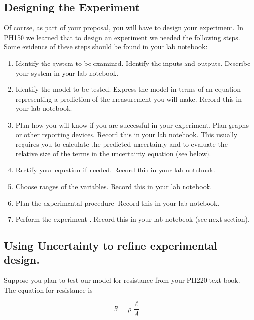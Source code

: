 \subsection{Designing the Experiment}

Of course, as part of your proposal, you will have to design your experiment. In PH150 we learned that to design an experiment we needed the following steps. Some evidence of these steps should be found in your lab notebook:

\begin{enumerate}
	\item Identify the system to be examined. Identify the inputs and outputs.
	Describe your system in your lab notebook.
	
	\item Identify the model to be tested. Express the model in terms of an
	equation representing a prediction of the measurement you will make. Record
	this in your lab notebook.
	
	\item Plan how you will know if you are successful in your experiment. Plan
	graphs or other reporting devices. Record this in your lab notebook. This
	usually requires you to calculate the predicted uncertainty and to evaluate
	the relative size of the terms in the uncertainty equation (see below).
	
	\item Rectify your equation if needed. Record this in your lab notebook.
	
	\item Choose ranges of the variables. Record this in your lab notebook.
	
	\item Plan the experimental procedure. Record this in your lab notebook.
	
	\item Perform the experiment . Record this in your lab notebook (see next
	section).
\end{enumerate}

\subsection{Using Uncertainty to refine experimental design.}

Suppose you plan to test our model for resistance from your PH220 text book.
The equation for resistance is 

\begin{equation*}
	R=\rho \frac{\ell }{A}
\end{equation*}

